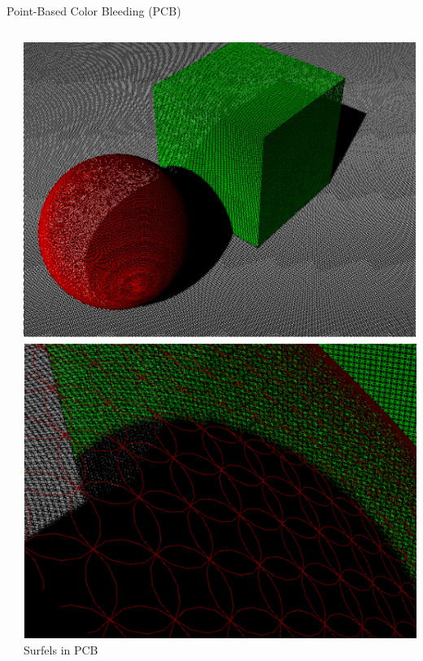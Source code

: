 \documentclass[10pt,compress,professionalfont]{beamer}
\begin{document}
\begin{frame}{Point-Based Color Bleeding (PCB)}
\begin{columns}
\begin{column}{0.65\textwidth}
        \end{column}
        \begin{column}{0.35\textwidth}
            \vspace{-4mm}
            \includegraphics[width=\textwidth]{../img/external/pcb}\\
            {\centering\scriptsize Surfels in PCB\\}
        \end{column}
    \end{columns}

\end{frame}
\end{document}
